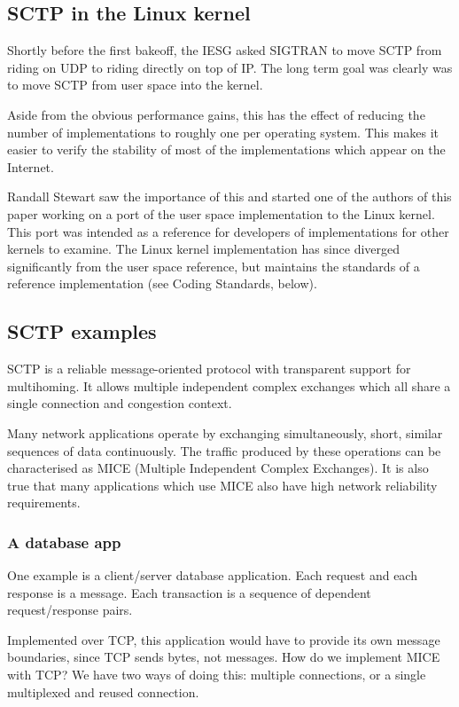 \documentclass[twocolumn]{article}
\begin{document}
\subsection{SCTP in the Linux kernel}

Shortly before the first bakeoff, the IESG asked SIGTRAN to move SCTP
from riding on UDP to riding directly on top of IP.  The long term
goal was clearly was to move SCTP from user space into the kernel.

Aside from the obvious performance gains, this has the effect of
reducing the number of implementations to roughly one per operating
system.  This makes it easier to verify the stability of most of the
implementations which appear on the Internet.

Randall Stewart saw the importance of this and started one of the
authors of this paper working on a port of the user space
implementation to the Linux kernel.  This port was intended as a
reference for developers of implementations for other kernels to
examine.  The Linux kernel implementation has since diverged
significantly from the user space reference, but maintains the
standards of a reference implementation (see Coding Standards, below).

\subsection{SCTP examples}

SCTP is a reliable message-oriented protocol with transparent support
for multihoming.  It allows multiple independent complex exchanges
which all share a single connection and congestion context.

Many network applications operate by exchanging simultaneously, short,
similar sequences of data continuously.  The traffic produced by these
operations can be characterised as MICE (Multiple Independent Complex
Exchanges).  It is also true that many applications which use MICE
also have high network reliability requirements.

\subsubsection{A database app}
One example is a client/server database application.  Each request and
each response is a message.  Each transaction is a sequence of
dependent request/response pairs.

Implemented over TCP, this application would have to provide its own
message boundaries, since TCP sends bytes, not messages.  How do we
implement MICE with TCP?  We have two ways of doing this:  multiple
connections, or a single multiplexed and reused connection.
\end{document}
